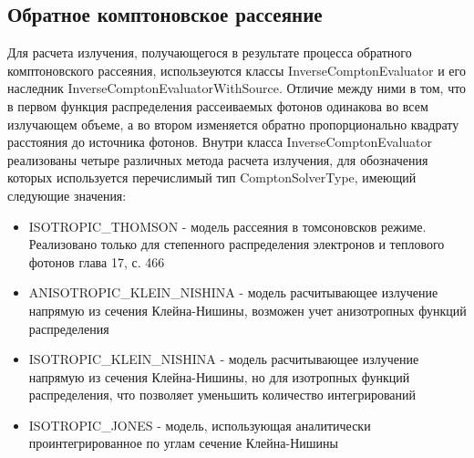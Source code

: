 \subsection{Обратное комптоновское рассеяние}
Для расчета излучения, получающегося в результате процесса обратного комптоновского рассеяния, использеуются классы InverseComptonEvaluator и его наследник InverseComptonEvaluatorWithSource. Отличие между ними в том, что в первом функция распределения рассеиваемых фотонов одинакова во всем излучающем объеме, а во втором изменяется обратно пропорционально квадрату расстояния до источника фотонов. Внутри класса  InverseComptonEvaluator реализованы четыре различных метода расчета излучения, для обозначения которых используется перечислимый тип ComptonSolverType, имеющий следующие значения:

\begin{itemize}
	\item ISOTROPIC\_THOMSON - модель рассеяния в томсоновсков режиме. Реализовано только для степенного распределения электронов и теплового фотонов \cite{Ginzburg1975} глава 17, с. 466
	\item ANISOTROPIC\_KLEIN\_NISHINA - модель расчитывающее излучение напрямую из сечения Клейна-Нишины, возможен учет анизотропных функций распределения \cite{KleinNishina, Dubus}
	\item ISOTROPIC\_KLEIN\_NISHINA - модель расчитывающее излучение напрямую из сечения Клейна-Нишины, но для изотропных функций распределения, что позволяет уменьшить количество интегрирований
	\item ISOTROPIC\_JONES - модель, использующая аналитически проинтегрированное по углам сечение Клейна-Нишины \cite{JonesCompton, BykovUvarov2000}
\end{itemize}

